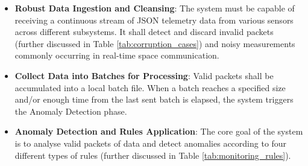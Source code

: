 \documentclass{article}
\begin{document}

\begin{itemize}
    \item \textbf{Robust Data Ingestion and Cleansing}: The system must be capable of receiving a continuous stream of JSON telemetry data from various sensors across different subsystems. It shall detect and discard invalid packets (further discussed in Table \ref{tab:corruption_cases}) and noisy measurements commonly occurring in real-time space communication.
    \item \textbf{Collect Data into Batches for Processing}: Valid packets shall be accumulated into a local batch file. When a batch reaches a specified size and/or enough time from the last sent batch is elapsed, the system triggers the Anomaly Detection phase.
    \item \textbf{Anomaly Detection and Rules Application}: The core goal of the system is to analyse valid packets of data and detect anomalies according to four different types of rules (further discussed in Table \ref{tab:monitoring_rules}).
\end{itemize}
\end{document}
